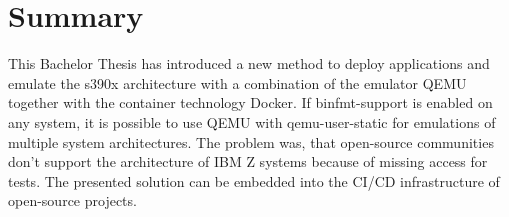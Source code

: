 \chapter{Summary}\label{ch:summary}

This Bachelor Thesis has introduced a new method to deploy applications and emulate the s390x architecture with a combination of the emulator QEMU together with the container technology Docker.
If binfmt-support is enabled on any system, it is possible to use QEMU with qemu-user-static for emulations of multiple system architectures. 
The problem was, that open-source communities don't support the architecture of IBM Z systems because of missing access for tests. The presented solution can be embedded into the CI/CD infrastructure of open-source projects.
